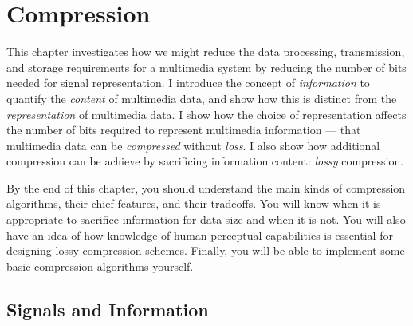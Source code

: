 
%
%
%
%

\chapter{Compression}
\label{ch:compression}

This chapter investigates how we might reduce the data processing,
transmission, and storage requirements for a multimedia system by
reducing the number of bits needed for signal representation. I
introduce the concept of \emph{information} to quantify the
\emph{content} of multimedia data, and show how this is distinct from
the \emph{representation} of multimedia data. I show how the choice of
representation affects the number of bits required to represent
multimedia information --- that multimedia data can be
\emph{compressed} without \emph{loss}.  I also show how additional
compression can be achieve by sacrificing information content:
\emph{lossy} compression.

By the end of this chapter, you should understand the main kinds of
compression algorithms, their chief features, and their tradeoffs.
You will know when it is appropriate to sacrifice information for data
size and when it is not.  You will also have an idea of how knowledge
of human perceptual capabilities is essential for designing lossy
compression schemes. Finally, you will be able to implement some basic
compression algorithms yourself.

\section{Signals and Information}

